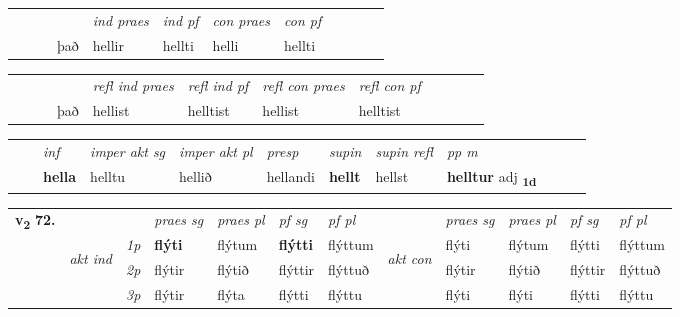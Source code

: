 \begin{tabular}{llllllllllll}
 & &  & &  \textit{ind praes} & \textit{ind pf} & \textit{con praes} & \textit{con pf} \\*
&  & & það & hellir & hellti & helli & hellti \\*
\cmidrule{5-9}
\end{tabular}


\begin{tabular}{llllllllllll}
 & &  & &  \textit{refl ind praes} & \textit{refl ind pf} & \textit{refl con praes} & \textit{refl con pf} \\*
 & &  & það & hellist & helltist & hellist & helltist \\*
\cmidrule{5-9}
\end{tabular}


\begin{tabular}{llllllllllll}
 & & \textit{inf} & \textit{imper akt sg} & \textit{imper akt pl}   & \textit{presp} & \textit{supin} & \textit{supin refl} & \textit{pp m}     \\*
  & & \textbf{hella} & helltu  & hellið   & hellandi &  \textbf{hellt} & hellst & \textbf{helltur} adj \textbf{\textsubscript{1d}} \\*
\cmidrule{1-12}
\end{tabular}



\begin{tabular}{llllllllllll} \toprule
\multirow{4}{*}{{{\textbf{v{\textsubscript{2}}} \Large{\textbf{72.}}}}}  & &   &  \textit{praes sg}  & \textit{praes pl}  &\textit{ pf sg} & \textit{pf pl} &  &  \textit{praes sg}  & \textit{praes pl}  & \textit{pf sg} & \textit{pf pl } \\*
	\cmidrule{4-7} \cmidrule{9-12}
 & \multirow{3}{*}{\begin{turn}{90}\textit{akt ind}\end{turn}} & {\textit{1p}} & \textbf{flýti} & flýtum    & \textbf{flýtti} & flýttum & \multirow{3}{*}{\begin{turn}{90}\textit{akt con}\end{turn}} &flýti & flýtum & flýtti & flýttum\\*
& &  {\textit{2p}} &  flýtir  & flýtið   & flýttir & flýttuð & & flýtir & flýtið & flýttir & flýttuð \\*
& &  {\textit{3p}} & flýtir & flýta   & flýtti & flýttu & & flýti & flýti& flýtti & flýttu  \\*
\cmidrule{4-7} \cmidrule{9-12}
\end{tabular}


